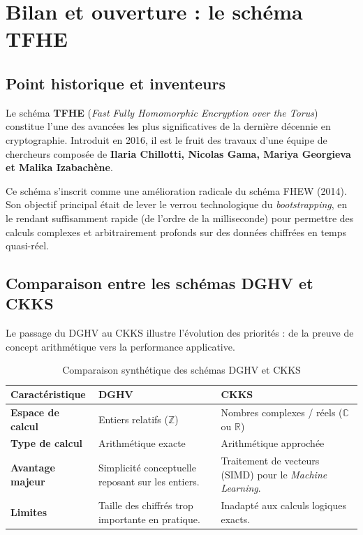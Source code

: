 \chapter{Bilan et ouverture : le schéma TFHE}

\section{Point historique et inventeurs}

Le schéma \textbf{TFHE} (\textit{Fast Fully Homomorphic Encryption over the Torus}) constitue l'une des avancées les plus significatives de la dernière décennie en cryptographie. Introduit en 2016, il est le fruit des travaux d'une équipe de chercheurs composée de \textbf{Ilaria Chillotti, Nicolas Gama, Mariya Georgieva et Malika Izabachène}. 

Ce schéma s'inscrit comme une amélioration radicale du schéma FHEW (2014). Son objectif principal était de lever le verrou technologique du \textit{bootstrapping}, en le rendant suffisamment rapide (de l'ordre de la milliseconde) pour permettre des calculs complexes et arbitrairement profonds sur des données chiffrées en temps quasi-réel.

\section{Comparaison entre les schémas DGHV et CKKS}

Le passage du DGHV au CKKS illustre l'évolution des priorités : de la preuve de concept arithmétique vers la performance applicative.

\begin{table}[h!]
\centering
\renewcommand{\arraystretch}{1.5}
\begin{tabular}{|l|p{5cm}|p{5cm}|}
\hline
\textbf{Caractéristique} & \textbf{DGHV} & \textbf{CKKS} \\ \hline
\textbf{Espace de calcul} & Entiers relatifs ($\mathbb{Z}$) & Nombres complexes / réels ($\mathbb{C}$ ou $\mathbb{R}$) \\ \hline
\textbf{Type de calcul} & Arithmétique exacte & Arithmétique approchée \\ \hline
\textbf{Avantage majeur} & Simplicité conceptuelle reposant sur les entiers. & Traitement de vecteurs (SIMD) pour le \textit{Machine Learning}. \\ \hline
\textbf{Limites} & Taille des chiffrés trop importante en pratique. & Inadapté aux calculs logiques exacts. \\ \hline
\end{tabular}
\caption{Comparaison synthétique des schémas DGHV et CKKS}
\end{table}

